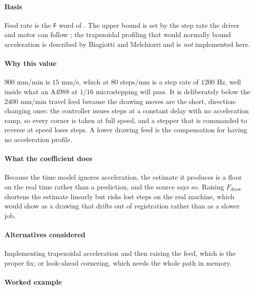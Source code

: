 \paragraph{Basis}

Feed rate is the \texttt{F} word of \cite{iso6983}. The upper bound is set by the step rate the driver and motor can follow \cite{a4988ds,stepperds}; the trapezoidal profiling that would normally bound acceleration is described by Biagiotti and Melchiorri \cite{biagiotti2008} and is \emph{not} implemented here.

\paragraph{Why this value}

$900$ mm/min is $15$ mm/s, which at $80$ steps/mm is a step rate of $1200$ Hz, well inside what an A4988 at $1/16$ microstepping will pass. It is deliberately below the $2400$ mm/min travel feed because the drawing moves are the short, direction-changing ones: the controller issues steps at a constant delay with no acceleration ramp, so every corner is taken at full speed, and a stepper that is commanded to reverse at speed loses steps. A lower drawing feed is the compensation for having no acceleration profile.

\paragraph{What the coefficient does}

Because the time model ignores acceleration, the estimate it produces is a floor on the real time rather than a prediction, and the source says so. Raising $F_{\text{draw}}$ shortens the estimate linearly but risks lost steps on the real machine, which would show as a drawing that drifts out of registration rather than as a slower job.

\paragraph{Alternatives considered}

Implementing trapezoidal acceleration \cite{biagiotti2008} and then raising the feed, which is the proper fix; or look-ahead cornering, which needs the whole path in memory.

\paragraph{Worked example}

